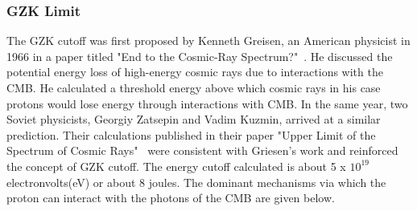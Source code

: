 \subsubsection{GZK Limit}
\label{subsubsec:GZK} 
The GZK cutoff was first proposed by Kenneth Greisen, an American physicist in 1966 in a paper titled "End to the Cosmic-Ray Spectrum?"~\cite{}. He discussed the potential energy loss of high-energy cosmic rays due to interactions with the CMB. He calculated a threshold energy above which cosmic rays in his case protons would lose energy through interactions with CMB. In the same year, two Soviet physicists, Georgiy Zatsepin and Vadim Kuzmin, arrived at a similar prediction. Their calculations published in their paper "Upper Limit of the Spectrum of Cosmic Rays"~\cite{} were consistent with Griesen's work and reinforced the concept of GZK cutoff.  
The energy cutoff calculated is about 5 x $10^{19}$ electronvolts(eV) or about 8 joules. The dominant mechanisms via which the proton can interact with the photons of the CMB are given below. 

